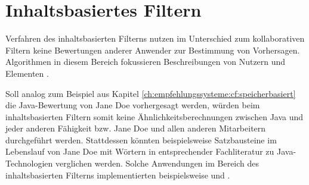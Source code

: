 \section{Inhaltsbasiertes Filtern}
\label{ch:empfehlungssysteme:inhaltsbasiertesFiltern}
Verfahren des inhaltsbasierten Filterns nutzen im Unterschied zum kollaborativen Filtern keine Bewertungen anderer Anwender zur Bestimmung von Vorhersagen. Algorithmen in diesem Bereich fokussieren Beschreibungen von Nutzern und Elementen \cite[S. 139f.]{recommenderSystems:2016}.

Soll analog zum Beispiel aus Kapitel \ref{ch:empfehlungssysteme:cf:speicherbasiert} die Java-Bewertung von Jane Doe vorhergesagt werden, würden beim inhaltsbasierten Filtern somit keine Ähnlichkeitsberechnungen zwischen Java und jeder anderen Fähigkeit bzw. Jane Doe und allen anderen Mitarbeitern durchgeführt werden. Stattdessen könnten beispielsweise Satzbausteine im Lebenslauf von Jane Doe mit Wörtern in entsprechender Fachliteratur zu Java-Technologien verglichen werden. Solche Anwendungen im Bereich des inhaltsbasierten Filterns implementierten beispielsweise \textcite[S. 4ff.]{guo:2016} und \textcite[S. 3ff.]{prospect:2010}.

